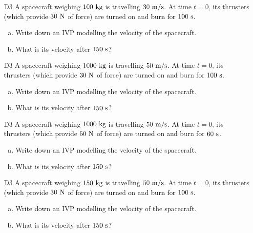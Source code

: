 \begin{problem}{D3}
A spacecraft weighing \(100\ {\rm kg}\) is travelling \(30\ {\rm m/s}\).  At time \(t=0\), its thrusters (which provide \(30\ {\rm N}\) of force) are turned on and burn for \(100\ {\rm s}\).  
\begin{enumerate}[(a)]
\item Write down an IVP modelling the velocity of the spacecraft.
\item What is its velocity after \(150\ {\rm s}\)?
\end{enumerate}
\end{problem}

\begin{problem}{D3}
A spacecraft weighing \(1000\ {\rm kg}\) is travelling \(50\ {\rm m/s}\).  At time \(t=0\), its thrusters (which provide \(30\ {\rm N}\) of force) are turned on and burn for \(100\ {\rm s}\).  
\begin{enumerate}[(a)]
\item Write down an IVP modelling the velocity of the spacecraft.
\item What is its velocity after \(150\ {\rm s}\)?
\end{enumerate}
\end{problem}

\begin{problem}{D3}
A spacecraft weighing \(1000\ {\rm kg}\) is travelling \(50\ {\rm m/s}\).  At time \(t=0\), its thrusters (which provide \(50\ {\rm N}\) of force) are turned on and burn for \(60\ {\rm s}\).  
\begin{enumerate}[(a)]
\item Write down an IVP modelling the velocity of the spacecraft.
\item What is its velocity after \(150\ {\rm s}\)?
\end{enumerate}
\end{problem}




\begin{problem}{D3}
A spacecraft weighing \(150\ {\rm kg}\) is travelling \(50\ {\rm m/s}\).  At time \(t=0\), its thrusters (which provide \(30\ {\rm N}\) of force) are turned on and burn for \(100\ {\rm s}\).  
\begin{enumerate}[(a)]
\item Write down an IVP modelling the velocity of the spacecraft.
\item What is its velocity after \(150\ {\rm s}\)?
\end{enumerate}
\end{problem}

